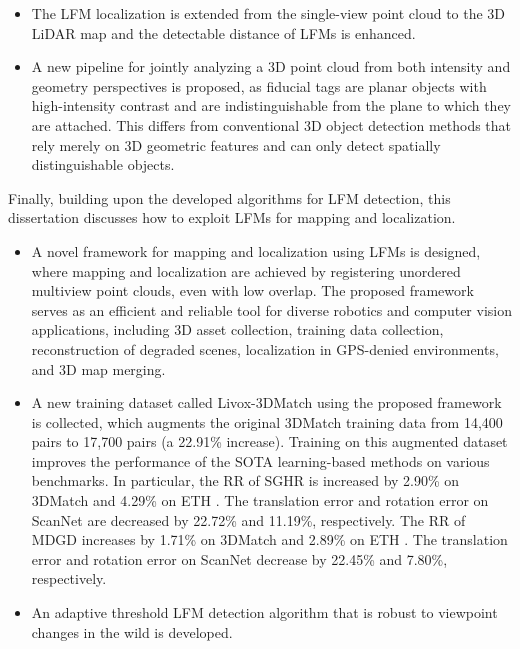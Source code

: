 \begin{itemize}
	\item The LFM localization is extended from the single-view point cloud to the 3D LiDAR map and the detectable distance of LFMs is enhanced. 
	\item A new pipeline for jointly analyzing a 3D point cloud from both intensity and geometry perspectives is proposed, as fiducial tags are planar objects with high-intensity contrast and are indistinguishable from the plane to which they are attached. This differs from conventional 3D object detection methods that rely merely on 3D geometric features and can only detect spatially distinguishable objects.
\end{itemize} \par
Finally, building upon the developed algorithms for LFM detection, this dissertation discusses how to exploit LFMs for mapping and localization.
\begin{itemize}
	\item A novel framework for mapping and localization using LFMs is designed, where mapping and localization are achieved by registering unordered multiview point clouds, even with low overlap. The proposed framework serves as an efficient and reliable tool for diverse robotics and computer vision applications, including 3D asset collection, training data collection, reconstruction of degraded scenes, localization in GPS-denied environments, and 3D map merging.
	\item A new training dataset called Livox-3DMatch using the proposed framework is collected, which augments the original 3DMatch training data \cite{3dmatch} from 14,400 pairs to 17,700 pairs (a 22.91\% increase). Training on this augmented dataset improves the performance of the SOTA learning-based methods on various benchmarks. In particular, the RR of SGHR \cite{sghr} is increased by 2.90\% on 3DMatch \cite{3dmatch} and 4.29\% on ETH \cite{eth}. The translation error and rotation error on ScanNet \cite{scan} are decreased by 22.72\% and 11.19\%, respectively. The RR of MDGD \cite{mdgd} increases by 1.71\% on 3DMatch \cite{3dmatch} and 2.89\% on ETH \cite{eth}. The translation error and rotation error on ScanNet \cite{scan} decrease by 22.45\% and 7.80\%, respectively.
\item An adaptive threshold LFM detection algorithm that is robust to viewpoint changes in the wild is developed.
 
\end{itemize}

